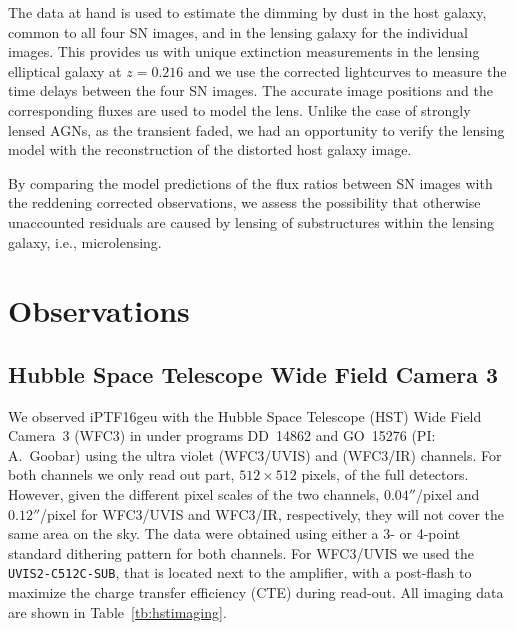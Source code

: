 \documentclass[a4paper,fleqn,usenatbib]{mnras}
\newcommand{\geu}{iPTF16geu\xspace}
\newcommand{\sn}{SN\xspace}
\newcommand{\wfc}{WFC3\xspace}
\newcommand{\wfcuvis}{WFC3/UVIS\xspace}
\newcommand{\wfcir}{WFC3/IR\xspace}
\newcommand{\uvisaperture}{{\tt UVIS2-C512C-SUB}\xspace}
\newcommand{\iraperture}{{\tt IRSUB512}\xspace}
\begin{document}
The data at hand is used to estimate the dimming by dust in the host galaxy, common to all four \sn images, and in the lensing galaxy for the individual images. This provides us with unique extinction measurements in the lensing elliptical galaxy at $z=0.216$ and we use the corrected lightcurves to measure the time delays between the four \sn images. The accurate image positions and the corresponding fluxes are used to model the lens. Unlike the case of strongly lensed AGNs, as the transient faded, we had an opportunity to verify the lensing model with the reconstruction of the distorted host galaxy image. 

By comparing the model predictions of the flux ratios between \sn images with the reddening corrected observations, we assess the possibility that otherwise unaccounted  residuals are caused by lensing of substructures within the lensing galaxy, i.e., microlensing.  

\section{Observations}
\subsection{Hubble Space Telescope Wide Field Camera 3}
We observed \geu with the Hubble Space Telescope (HST) Wide Field Camera~3 (\wfc) in under programs DD~14862 and 
GO~15276 (PI: A.~Goobar) using the ultra violet (\wfcuvis) and (\wfcir) channels.  For both channels we only read out part, 
$512\times512$ pixels, of the full detectors.  However, given the different pixel scales of the two channels, 
$0.04''$/pixel and $0.12''$/pixel for \wfcuvis and \wfcir, respectively, they will not cover the same area on the sky.  
The data were obtained using either a 3- or 4-point standard dithering pattern for both channels.  For \wfcuvis we used 
the \uvisaperture, that is located next to the amplifier, with a post-flash to maximize the charge transfer efficiency (CTE) 
during read-out.  All imaging data are shown in Table~\ref{tb:hstimaging}.

\begin{table}
\centering
\caption{Hubble Space Telescope Wide Field Camera 3 data imaging data presented here.  The columns are the civil date, 
the Modified Julian Date (MJD), the HST passband, total exposure time, the number of sub-exposures, and the \wfc camera.  
The \wfcuvis and \wfcir data were obtained with the  \uvisaperture and \iraperture subarray, respectively.  \label{tb:hstimaging}}

\end{table}
\end{document}
